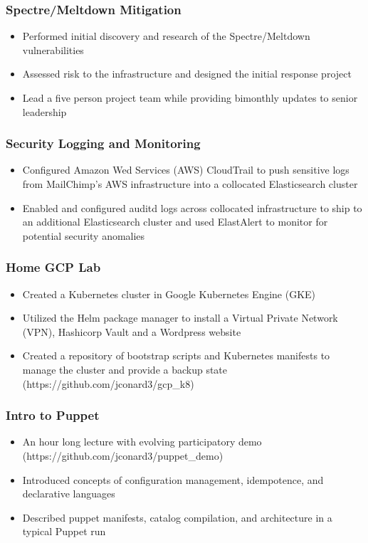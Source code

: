 \documentclass[letterpaper]{article}
\begin{document}
\subsubsection*{Spectre/Meltdown Mitigation}
\begin{itemize}[noitemsep]
	\item Performed initial discovery and research of the Spectre/Meltdown vulnerabilities
	\item Assessed risk to the infrastructure and designed the initial response project
	\item Lead a five person project team while providing bimonthly updates to senior leadership
\end{itemize}
\subsubsection*{Security Logging and Monitoring}
\begin{itemize}[noitemsep]
	\item Configured Amazon Wed Services (AWS) CloudTrail to push sensitive logs from MailChimp's AWS infrastructure into a collocated Elasticsearch cluster
	\item Enabled and configured auditd logs across collocated infrastructure to ship to an additional Elasticsearch cluster and used ElastAlert to monitor for potential security anomalies
\end{itemize}
\subsubsection*{Home GCP Lab}
\begin{itemize}[noitemsep]
	\item Created a Kubernetes cluster in Google Kubernetes Engine (GKE)
	\item Utilized the Helm package manager to install a Virtual Private Network (VPN), Hashicorp Vault and a Wordpress website
	\item Created a repository of bootstrap scripts and Kubernetes manifests to manage the cluster and provide a backup state (https://github.com/jconard3/gcp\_k8)
\end{itemize}
\subsubsection*{Intro to Puppet}
\begin{itemize}[noitemsep]
	\item An hour long lecture with evolving participatory demo (https://github.com/jconard3/puppet\_demo)
	\item Introduced concepts of configuration management, idempotence, and declarative languages
	\item Described puppet manifests, catalog compilation, and architecture in a typical Puppet run
\end{itemize}
\end{document}
